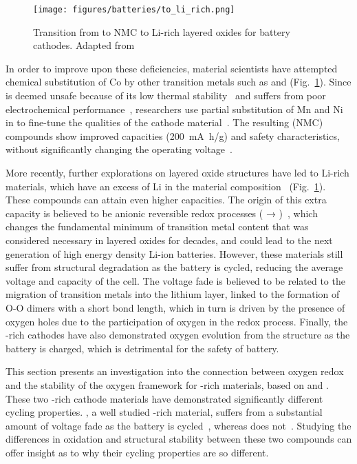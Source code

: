 \begin{refsection}
\begin{figure}[h]
\centering
\texttt{[image: figures/batteries/to\_li\_rich.png]}
\caption{Transition from  to NMC to Li-rich layered oxides for battery cathodes. Adapted from~\cite{Rozier2015} }
\label{batteries:fig-Lirich_transition}
\end{figure}

In order to improve upon these deficiencies, material scientists have attempted chemical substitution of Co by other transition metals such as  and  (Fig.~\ref{batteries:fig-Lirich_transition}). Since  is deemed unsafe because of its low thermal stability~\cite{Ohzuku1993} and  suffers from poor electrochemical performance~\cite{Vitins1997}, researchers use partial substitution of Mn and Ni in  to fine-tune the qualities of the cathode material~\cite{Koyama2003}. The resulting  (NMC) compounds show improved capacities (200~\si{\milli\ampere\hour/\gram}) and safety characteristics, without significantly changing the operating voltage~\cite{Zhou2011}. 

More recently, further explorations on layered oxide structures have led to Li-rich materials, which have an excess of Li in the material composition~\cite{Thackeray2007} (Fig.~\ref{batteries:fig-Lirich_transition}). These compounds can attain even higher capacities. The origin of this extra capacity is believed to be anionic reversible redox processes ( → )~\cite{Sathiya2013}, which changes the fundamental minimum of transition metal content that was considered necessary in layered oxides for decades, and could lead to the next generation of high energy density Li-ion batteries. However, these materials still suffer from structural degradation as the battery is cycled, reducing the average voltage and capacity of the cell. The voltage fade is believed to be related to the migration of transition metals into the lithium layer, linked to the formation of O-O dimers with a short bond length, which in turn is driven by the presence of oxygen holes due to the participation of oxygen in the redox process. Finally, the -rich cathodes have also demonstrated oxygen evolution from the structure as the battery is charged, which is detrimental for the safety of battery.

This section presents an investigation into the connection between oxygen redox and the stability of the oxygen framework for -rich materials, based on  and . These two -rich cathode materials have demonstrated significantly different cycling properties. , a well studied -rich material, suffers from a substantial amount of voltage fade as the battery is cycled~\cite{Croy2014}, whereas  does not~\cite{McCalla2015}. Studying the differences in oxidation and structural stability between these two compounds can offer insight as to why their cycling properties are so different. 


\end{refsection}
